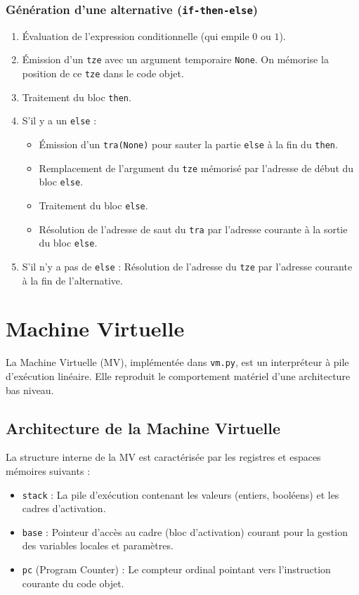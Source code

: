 \documentclass[a4paper, 12pt]{article}
\begin{document}
\subsubsection{Génération d'une alternative (\texttt{if-then-else})}
\begin{enumerate}
    \item Évaluation de l'expression conditionnelle (qui empile $0$ ou $1$).
    \item Émission d'un \texttt{tze} avec un argument temporaire \texttt{None}. On mémorise la position de ce \texttt{tze} dans le code objet.
    \item Traitement du bloc \texttt{then}.
    \item S'il y a un \texttt{else} :
    \begin{itemize}
        \item Émission d'un \texttt{tra(None)} pour sauter la partie \texttt{else} à la fin du \texttt{then}.
        \item Remplacement de l'argument du \texttt{tze} mémorisé par l'adresse de début du bloc \texttt{else}.
        \item Traitement du bloc \texttt{else}.
        \item Résolution de l'adresse de saut du \texttt{tra} par l'adresse courante à la sortie du bloc \texttt{else}.
    \end{itemize}
    \item S'il n'y a pas de \texttt{else} : Résolution de l'adresse du \texttt{tze} par l'adresse courante à la fin de l'alternative.
\end{enumerate}


\newpage

\section{Machine Virtuelle}

La Machine Virtuelle (MV), implémentée dans \texttt{vm.py}, est un interpréteur à pile d'exécution linéaire. Elle reproduit le comportement matériel d'une architecture bas niveau.

\subsection{Architecture de la Machine Virtuelle}
La structure interne de la MV est caractérisée par les registres et espaces mémoires suivants :
\begin{itemize}
    \item \texttt{stack} : La pile d'exécution contenant les valeurs (entiers, booléens) et les cadres d'activation.
    \item \texttt{base} : Pointeur d'accès au cadre (bloc d'activation) courant pour la gestion des variables locales et paramètres.
    \item \texttt{pc} (Program Counter) : Le compteur ordinal pointant vers l'instruction courante du code objet.
\end{itemize}
\end{document}
